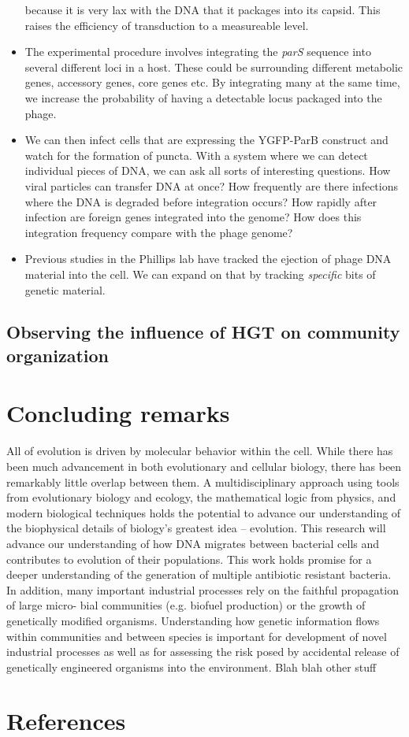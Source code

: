 \begin{itemize}
			because it is very lax with the DNA that it packages
			into its capsid. This raises the efficiency of
			transduction to a measureable level. 
		\item The experimental procedure involves integrating the
			\textit{parS} sequence into several different loci in a
			host. These could be surrounding different metabolic
			genes, accessory genes,  core genes etc. By integrating
			many at the same time, we increase the probability of
			having a detectable locus packaged into the phage.
		\item We can then infect cells that are expressing the YGFP-ParB
			construct and watch for the formation of puncta. With a
			system where we can detect individual pieces of DNA, we
			can ask all sorts of interesting questions. How viral
			particles can transfer DNA at once? How frequently are
			there infections where the DNA is degraded before
			integration occurs? How rapidly after infection are
			foreign genes integrated into the genome? How does this
			integration frequency compare with the phage genome?
		\item Previous studies in the Phillips lab have tracked the
			ejection of phage DNA material into the cell. We can
			expand on that by tracking \textit{specific} bits of
			genetic material.
	\end{itemize}
\subsection*{Observing the influence of HGT on community organization}


\section*{Concluding remarks}
All of evolution is driven by molecular behavior within the cell. While there has
been much advancement in both evolutionary and cellular biology, there has been
remarkably little overlap between them. A multidisciplinary approach using tools
from evolutionary biology and ecology, the mathematical logic from physics, and
modern biological techniques holds the potential to advance our understanding of
the biophysical details of biology’s greatest idea
– evolution. This research will advance our understanding of how DNA migrates
between bacterial cells and contributes to evolution of their populations. This
work holds promise for a deeper understanding of the generation of multiple
antibiotic resistant bacteria. In addition, many important industrial processes
rely on the faithful propagation of large micro- bial communities (e.g. biofuel
production) or the growth of genetically modified organisms. Understanding how
genetic information flows within communities and between species is important
for development of novel industrial processes as well as for assessing the risk
posed by accidental release of genetically engineered organisms into the
environment. Blah blah other stuff


\section*{References}

{}

